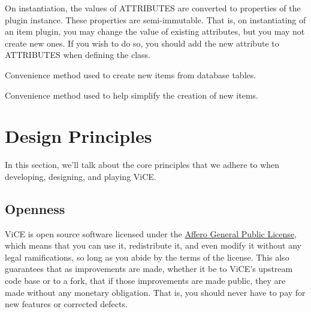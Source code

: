 \documentclass[letterpaper,10pt,english]{sphinxmanual}
\begin{document}
\begin{fulllineitems}
On instantiation, the values of ATTRIBUTES are converted to properties
of the plugin instance. These properties are semi-immutable. That is,
on instantiating of an item plugin, you may change the value of existing
attributes, but you may not create new ones. If you wish to do so, you
should add the new attribute to ATTRIBUTES when defining the class.

\begin{fulllineitems}
\label{api_reference:vice.plugins.items.Item.fromTable}
Convenience method used to create new items from database tables.

\end{fulllineitems}


\begin{fulllineitems}
\label{api_reference:vice.plugins.items.Item.new}
Convenience method used to help simplify the creation of new items.

\end{fulllineitems}


\end{fulllineitems}



\part{Design Principles}
\label{index:design-principles}
In this section, we'll talk about the core principles that we adhere to when
developing, designing, and playing ViCE.


\chapter{Openness}
\label{index:openness}
ViCE is open source software licensed under
the \href{http://www.gnu.org/licenses/agpl-3.0.html}{Affero General Public License},
which means that you can use it, redistribute it, and even modify it without
any legal ramifications, so long as you abide by the terms of the license.
This also guarantees that as improvements are made, whether it be to
ViCE's upstream code base or to a fork, that
if those improvements are made public, they are made without any monetary
obligation. That is, you should never have to pay for new features or corrected defects.
\end{document}
